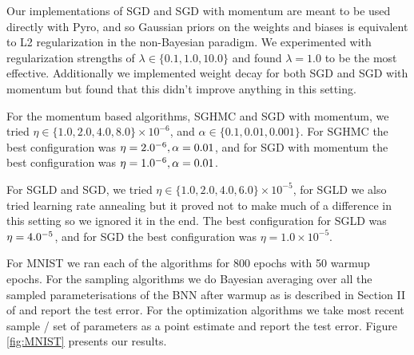 Our implementations of SGD and SGD with momentum are meant to be used directly with Pyro, and so Gaussian priors on the weights and biases is equivalent to L2 regularization in the non-Bayesian paradigm. We experimented with regularization strengths of $\lambda \in \{0.1, 1.0, 10.0\}$ and found $\lambda = 1.0$ to be the most effective. Additionally we implemented weight decay for both SGD and SGD with momentum but found that this didn't improve anything in this setting.

For the momentum based algorithms, SGHMC and SGD with momentum, we tried $\eta \in \{1.0, 2.0, 4.0, 8.0 \} \times 10^{-6}$, and $\alpha \in \{0.1, 0.01, 0.001 \}$. For SGHMC the best configuration was $\eta = 2.0\time10^{-6}, \alpha=0.01$, and for SGD with momentum the best configuration was $\eta = 1.0\time10^{-6}, \alpha=0.01$.

For SGLD and SGD, we tried $\eta \in \{1.0, 2.0, 4.0, 6.0\} \times 10^{-5}$, for SGLD we also tried learning rate annealing but it proved not to make much of a difference in this setting so we ignored it in the end. The best configuration for SGLD was $\eta = 4.0\time10^{-5}$, and for SGD the best configuration was $\eta = 1.0\times10^{-5}$.

For MNIST we ran each of the algorithms for 800 epochs with 50 warmup epochs. For the sampling algorithms we do Bayesian averaging over all the sampled parameterisations of the BNN after warmup as is described in Section II of \cite{hands-on-bnn} and report the test error. For the optimization algorithms we take most recent sample / set of parameters as a point estimate and report the test error.  Figure \ref{fig:MNIST} presents our results.


